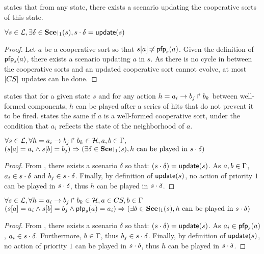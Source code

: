  states that from any state, there exists a scenario updating the cooperative sorts of this state.
\begin{theorem}
\label{th:update}
  $\forall s \in \PHl, \exists \delta \in \restriction{\Sce}{1}(s), s \PHplay \delta = \update(s)$
\end{theorem}
\begin{proof}
  Let $a$ be a cooperative sort so that ${s[a]} \not\nobreak\mkern -2mu = \mathsf{pfp}_s(a)$.
  Given the definition of $\mathsf{pfp}_s(a)$, there exists a scenario updating $a$ in $s$.
  As there is no cycle in between the cooperative sorts and an updated cooperative sort cannot evolve, at most $|CS|$ updates can be done.
\end{proof}
 states that for a given state $s$ and for any action $h = a_i\rightarrow b_j\Rsh b_k$ between well-formed components, $h$ can be played after a series of hits that do not prevent it to be fired.
 states the same if $a$ is a well-formed cooperative sort, under the condition that $a_i$ reflects the state of the neighborhood of $a$.
\begin{theorem}
\label{th:hcompcomp}
  $\forall s \in \mathcal{L}, \forall h = a_i\rightarrow b_j\Rsh b_k \in \mathcal{H}, a,b \in \Gamma,$\\
  $(\PHget{s}{a} = a_i \wedge \PHget{s}{b} = b_j) \Rightarrow (\exists \delta \in \restriction{\Sce}{1}(s), \text{$h$ can be played in $s \PHplay \delta$})$
\end{theorem}
\begin{proof}
  From , there exists a scenario $\delta$ so that: $(s \cdot \delta) = \mathsf{update}(s)$.
  As $a,b \in \Gamma$, $a_i \in s \cdot \delta$ and $b_j \in s \cdot \delta$.
  Finally, by definition of $\mathsf{update}(s)$, no action of priority $1$ can be played in $s \cdot \delta$, thus $h$ can be played in $s \cdot \delta$.
\end{proof}
\begin{theorem}
\label{th:hcscomp}
  $\forall s \in \mathcal{L}, \forall h = a_i\rightarrow b_j\Rsh b_k \in \mathcal{H}, a \in CS, b \in \Gamma$\\
  $(\PHget{s}{a} = a_i \wedge \PHget{s}{b} = b_j \wedge \pfp_s(a) = a_i) \Rightarrow (\exists \delta \in \restriction{\Sce}{1}(s), \text{$h$ can be played in $s \PHplay \delta$})$
\end{theorem}
\begin{proof}
  From , there exists a scenario $\delta$ so that: $(s \cdot \delta) = \mathsf{update}(s)$.
  As $a_i \in \mathsf{pfp}_s(a)$, $a_i \in s \cdot \delta$.
  Furthermore, $b \in \Gamma$, thus $b_j \in s \cdot \delta$.
  Finally, by definition of $\mathsf{update}(s)$, no action of priority $1$ can be played in $s \cdot \delta$, thus $h$ can be played in $s \cdot \delta$.
\end{proof}


